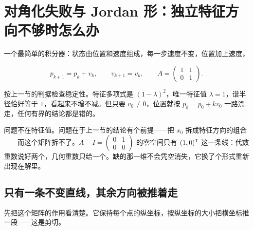 \section{对角化失败与 Jordan 形：独立特征方向不够时怎么办}
\label{sec:03-Linear-Algebra/05-Eigenvalues-and-Eigenvectors/03}

一个最简单的积分器：状态由位置和速度组成，每一步速度不变，位置加上速度，

\[
p_{k+1}=p_k+v_k,\qquad v_{k+1}=v_k,
\qquad
A=\begin{pmatrix}1&1\\0&1\end{pmatrix}.
\]

按上一节的判据检查稳定性。特征多项式是 \((1-\lambda)^2\)，唯一特征值 \(\lambda=1\)，谱半径恰好等于 \(1\)，看起来不增不减。但只要 \(v_0\neq 0\)，位置就按 \(p_k=p_0+kv_0\) 一路漂走，任何有界的结论都是错的。

问题不在特征值。问题在于上一节的结论有个前提——把 \(x_0\) 拆成特征方向的组合——而这个矩阵拆不了。\(A-I=\begin{pmatrix}0&1\\0&0\end{pmatrix}\) 的零空间只有 \((1,0)^{\mathsf{T}}\) 这一条线：代数重数说好两个，几何重数只给一个。缺的那一维不会凭空消失，它换了个形式重新出现在解里。

\subsection{只有一条不变直线，其余方向被推着走}

先把这个矩阵的作用看清楚。它保持每个点的纵坐标，按纵坐标的大小把横坐标推一段——这是剪切。

